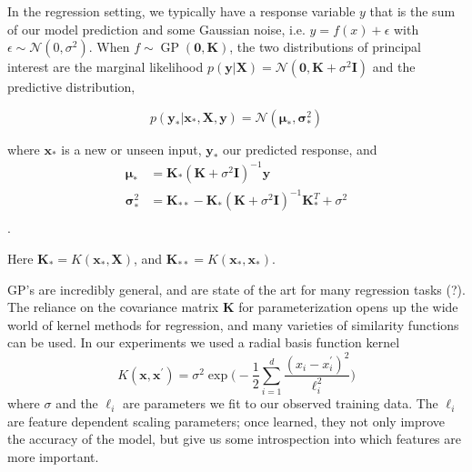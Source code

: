 In the regression setting, we typically have a response variable $y$ that
is the sum of our model prediction  and 
some Gaussian noise, i.e. $y = f(x) + \epsilon$ with 
$\epsilon \sim \mathcal{N}(0, \sigma^2)$. When
$f \sim \operatorname{GP}(\mathbf{0}, \mathbf{K})$, the
two distributions
of principal interest are the marginal likelihood
$p(\mathbf{y}|\mathbf{X}) = 
\mathcal{N}(\mathbf{0},\mathbf{K} + \sigma^2\mathbf{I})$ and the predictive
distribution,

$$p(\mathbf{y_*}|\mathbf{x_*},\mathbf{X},\mathbf{y}) =
\mathcal{N}(\boldsymbol{\mu}_*, \boldsymbol{\sigma}^2_*) $$

where $\mathbf{x_*}$ is a new or unseen input, $\mathbf{y_*}$ our predicted
response, and
\begin{align*}
\boldsymbol{\mu}_* & = \mathbf{K_*}(\mathbf{K} + \sigma^2\mathbf{I})^{-1}\mathbf{y} \\
\boldsymbol{\sigma}^2_* & 
= \mathbf{K}_{**} - \mathbf{K}_*(\mathbf{K} + \sigma^2\mathbf{I})^{-1}
\mathbf{K}_*^T + \sigma^2\\
\end{align*}.

Here $\mathbf{K}_* = K(\mathbf{x}_*, \mathbf{X})$, and 
$\mathbf{K}_{**} = K(\mathbf{x}_*, \mathbf{x}_*)$.


GP's are incredibly general, and are state of the art for many regression 
tasks (?). The reliance on the covariance matrix 
$\mathbf{K}$ for parameterization opens up the wide world of kernel methods
for regression, and many varieties of similarity functions can be used.
In our experiments we used a radial basis function kernel 
$$K(\mathbf{x},\mathbf{x}^\prime) = \sigma^2 \exp\bigg(- \frac{1}{2} 
\sum_{i=1}^d \frac{ (x_i-x^\prime_i)^2}{\ell_i^2} \bigg)$$ where 
$\sigma$ and the $\ell_i$ are parameters we fit to our observed training data.
The $\ell_i$ are feature dependent scaling parameters; once learned, they not
only improve the accuracy of the model, but give us some introspection 
into which features are more important.
